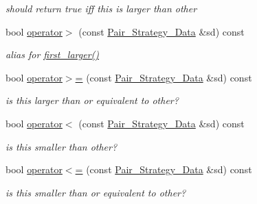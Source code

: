 \begin{Indent}
\begin{DoxyCompactItemize}
\begin{DoxyCompactList}\small\item\em should return {\ttfamily true} iff {\ttfamily this} is larger than other \end{DoxyCompactList}\item 
\mbox{\label{class_pair___strategy___data_aed30bba9721f2497fc80393ca2d26930}} 
bool \hyperlink{class_pair___strategy___data_aed30bba9721f2497fc80393ca2d26930}{operator$>$} (const \hyperlink{class_pair___strategy___data}{Pair\+\_\+\+Strategy\+\_\+\+Data} \&sd) const
\begin{DoxyCompactList}\small\item\em alias for \hyperlink{class_pair___strategy___data_a272edeb1893af886b4449d7bcb799cdb}{first\+\_\+larger()} \end{DoxyCompactList}\item 
\mbox{\label{class_pair___strategy___data_ac72e2a5cef6f9a6dafdb82f97495fd8b}} 
bool \hyperlink{class_pair___strategy___data_ac72e2a5cef6f9a6dafdb82f97495fd8b}{operator$>$=} (const \hyperlink{class_pair___strategy___data}{Pair\+\_\+\+Strategy\+\_\+\+Data} \&sd) const
\begin{DoxyCompactList}\small\item\em is {\ttfamily this} larger than or equivalent to other? \end{DoxyCompactList}\item 
\mbox{\label{class_pair___strategy___data_a5d5459ea25db09d848ab616c395fc209}} 
bool \hyperlink{class_pair___strategy___data_a5d5459ea25db09d848ab616c395fc209}{operator$<$} (const \hyperlink{class_pair___strategy___data}{Pair\+\_\+\+Strategy\+\_\+\+Data} \&sd) const
\begin{DoxyCompactList}\small\item\em is {\ttfamily this} smaller than other? \end{DoxyCompactList}\item 
\mbox{\label{class_pair___strategy___data_a19030cdc7b1f92c5941a78276e298f67}} 
bool \hyperlink{class_pair___strategy___data_a19030cdc7b1f92c5941a78276e298f67}{operator$<$=} (const \hyperlink{class_pair___strategy___data}{Pair\+\_\+\+Strategy\+\_\+\+Data} \&sd) const
\begin{DoxyCompactList}\small\item\em is {\ttfamily this} smaller than or equivalent to other? \end{DoxyCompactList}\end{DoxyCompactItemize}
\end{Indent}
